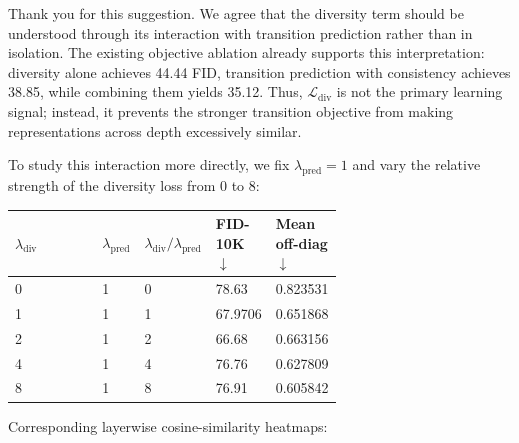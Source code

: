 \documentclass[10pt,letterpaper]{article}
\begin{document}
\begin{answerbox}

Thank you for this suggestion. We agree that the diversity term should be understood through its interaction with transition prediction rather than in isolation. The existing objective ablation already supports this interpretation: diversity alone achieves 44.44 FID, transition prediction with consistency achieves 38.85, while combining them yields 35.12. Thus, \(\mathcal{L}_{\mathrm{div}}\) is not the primary learning signal; instead, it prevents the stronger transition objective from making representations across depth excessively similar.


To study this interaction more directly, we fix \(\lambda_{\mathrm{pred}}=1\) and vary the relative strength of the diversity loss from 0 to 8:


\begin{cleanTable}
\small
\begin{tabularx}{\linewidth}{
    Y
    C{0.12\linewidth}
    C{0.17\linewidth}
    C{0.17\linewidth}
    C{0.19\linewidth}
}
\bfseries\color{white} \(\lambda_{\mathrm{div}}\)
& \bfseries\color{white} \(\lambda_{\mathrm{pred}}\)
& \bfseries\color{white} \(\lambda_{\mathrm{div}}/\lambda_{\mathrm{pred}}\)
& \bfseries\color{white} FID-10K \(\downarrow\)
& \bfseries\color{white} Mean off-diag \(\downarrow\) \\
 & 1 & 0 & 78.63
& 0.823531 \\

1 & 1 & 1
& 67.9706
& 0.651868 \\

2 & 1 & 2 & 66.68
& 0.663156 \\

4 & 1 & 4 & 76.76
& 0.627809 \\

8 & 1 & 8 & 76.91 & 0.605842
\end{tabularx}
\end{cleanTable}


Corresponding layerwise cosine-similarity heatmaps:


\end{answerbox}
\end{document}
